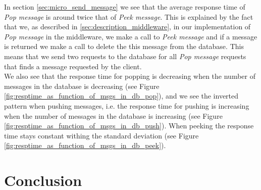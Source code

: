 \documentclass{article}
\begin{document}
            In section \ref{sec:micro_send_message} we see that the average response time of \textit{Pop message} is around twice that of \textit{Peek message}. This is explained by the fact that we, as described in \ref{sec:description_middleware}, in our implementation of \textit{Pop message} in the middleware, we make a call to \textit{Peek message} and if a message is returned we make a call to delete the this message from the database. This means that we send two requests to the database for all \textit{Pop message} requests that finds a message requested by the client. \\

            We also see that the response time for popping is decreasing when the number of messages in the database is decreasing (see Figure \ref{fig:resptime_as_function_of_msgs_in_db_pop}), and we see the inverted pattern when pushing messages, i.e. the response time for pushing is increasing when the number of messages in the database is increasing (see Figure \ref{fig:resptime_as_function_of_msgs_in_db_push}). When peeking the response time stays constant withing the standard deviation (see Figure \ref{fig:resptime_as_function_of_msgs_in_db_peek}).

    \section{Conclusion}
\end{document}
